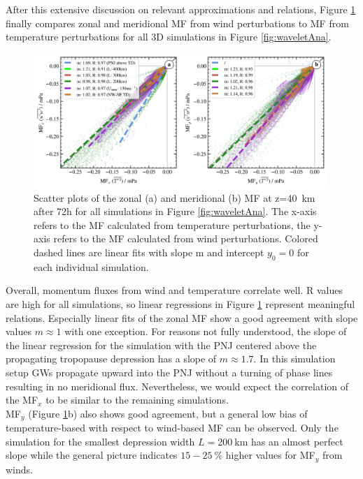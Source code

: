 After this extensive discussion on relevant approximations and relations, Figure \ref{fig:mf_scatter} finally compares zonal and meridional MF from wind perturbations to MF from temperature perturbations for all 3D simulations in Figure \ref{fig:waveletAna}.
\begin{figure}[t]
    \centering
    \includegraphics[width=0.99\textwidth]{figures_3D/waveletAna_mf_scatter.png}
    \caption{Scatter plots of the zonal (a) and meridional (b) MF at z=\SI{40}{\kilo\meter} after 72h for all simulations in Figure \ref{fig:waveletAna}. The x-axis refers to the MF calculated from temperature perturbations, the y-axis refers to the MF calculated from wind perturbations. Colored dashed lines are linear fits with slope m and intercept $y_{0}=0$ for each individual simulation.}
    \label{fig:mf_scatter}
\end{figure}
Overall, momentum fluxes from wind and temperature correlate well. R values are high for all simulations, so linear regressions in Figure \ref{fig:mf_scatter} represent meaningful relations. Especially linear fits of the zonal MF show a good agreement with slope values $m \approx 1$ with one exception. For reasons not fully understood, the slope of the linear regression for the simulation with the PNJ centered above the propagating tropopause depression has a slope of $m \approx 1.7$. In this simulation setup GWs propagate upward into the PNJ without a turning of phase lines resulting in no meridional flux. Nevertheless, we would expect the correlation of the MF$_x$ to be similar to the remaining simulations. \\
MF$_y$ (Figure \ref{fig:mf_scatter}b) also shows good agreement, but a general low bias of temperature-based with respect to wind-based MF can be observed. Only the simulation for the smallest depression width $L=\SI{200}{\kilo\meter}$ has an almost perfect slope while the general picture indicates $15-\SI{25}{\percent}$ higher values for MF$_y$ from winds.\\
